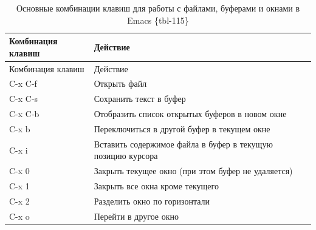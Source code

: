 \documentclass[
  english,
  russian,
  12pt,
  a4paper,
]{scrreprt}
\begin{document}
\begin{longtable}[]{@{}
  >{\raggedright\arraybackslash}p{}
  >{\raggedright\arraybackslash}p{}@{}}
\caption{Основные комбинации клавиш для работы с файлами, буферами и
окнами в Emacs \{tbl-115\}}\tabularnewline
\toprule\noalign{}
\begin{minipage}[b]{\linewidth}\raggedright
Комбинация клавиш
\end{minipage} & \begin{minipage}[b]{\linewidth}\raggedright
Действие
\end{minipage} \\
\midrule\noalign{}
\endfirsthead
\toprule\noalign{}
\begin{minipage}[b]{\linewidth}\raggedright
Комбинация клавиш
\end{minipage} & \begin{minipage}[b]{\linewidth}\raggedright
Действие
\end{minipage} \\
\midrule\noalign{}
\endhead
\bottomrule\noalign{}
\endlastfoot
C-x C-f & Открыть файл \\
C-x C-s & Сохранить текст в буфер \\
C-x C-b & Отобразить список открытых буферов в новом окне \\
C-x b & Переключиться в другой буфер в текущем окне \\
C-x i & Вставить содержимое файла в буфер в текущую позицию курсора \\
C-x 0 & Закрыть текущее окно (при этом буфер не удаляется) \\
C-x 1 & Закрыть все окна кроме текущего \\
C-x 2 & Разделить окно по горизонтали \\
C-x o & Перейти в другое окно \\
\end{longtable}
\end{document}
